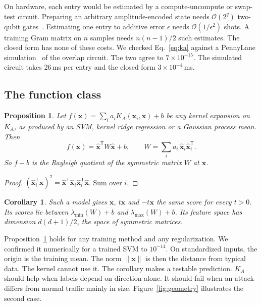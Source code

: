 \documentclass[pdflatex,sn-mathphys-num,lineno]{sn-jnl}
\theoremstyle{thmstyleone}
\newtheorem{proposition}{Proposition}
\newtheorem{corollary}{Corollary}
\begin{document}
On hardware, each entry would be estimated by a compute-uncompute or swap-test
circuit. Preparing an arbitrary amplitude-encoded state needs $\mathcal{O}(2^q)$
two-qubit gates~\cite{mottonen2005transformation}. Estimating one entry to
additive error $\epsilon$ needs $\mathcal{O}(1/\epsilon^2)$ shots. A training Gram
matrix on $n$ samples needs $n(n-1)/2$ such estimates. The closed form has none of
these costs. We checked Eq.~\eqref{eq:ka} against a PennyLane
simulation~\cite{bergholm2018pennylane} of the overlap circuit. The two agree to
$7\times10^{-15}$. The simulated circuit takes 26\,ms per entry and the closed form
$3\times10^{-4}$\,ms.

\subsection{The function class}

\begin{proposition}\label{prop:rayleigh}
Let $f(\mathbf{x})=\sum_i a_i K_A(\mathbf{x}_i,\mathbf{x})+b$ be any kernel expansion
on $K_A$, as produced by an SVM, kernel ridge regression or a Gaussian process
mean. Then
\begin{equation}
f(\mathbf{x}) = \hat{\mathbf{x}}^{\mathsf{T}} W \hat{\mathbf{x}} + b,
\qquad W=\sum_i a_i\,\hat{\mathbf{x}}_i\hat{\mathbf{x}}_i^{\mathsf{T}} .
\label{eq:rayleigh}
\end{equation}
So $f-b$ is the Rayleigh quotient of the symmetric matrix $W$ at $\mathbf{x}$.
\end{proposition}
\begin{proof}
$(\hat{\mathbf{x}}_i^{\mathsf{T}}\hat{\mathbf{x}})^2
=\hat{\mathbf{x}}^{\mathsf{T}}\hat{\mathbf{x}}_i\hat{\mathbf{x}}_i^{\mathsf{T}}\hat{\mathbf{x}}$.
Sum over $i$.
\end{proof}

\begin{corollary}\label{cor:inv}
Such a model gives $\mathbf{x}$, $t\mathbf{x}$ and $-t\mathbf{x}$ the same score for
every $t>0$. Its scores lie between $\lambda_{\min}(W)+b$ and
$\lambda_{\max}(W)+b$. Its feature space has dimension $d(d+1)/2$, the space of
symmetric matrices.
\end{corollary}

Proposition~\ref{prop:rayleigh} holds for any training method and any
regularization. We confirmed it numerically for a trained SVM to $10^{-14}$. On
standardized inputs, the origin is the training mean. The norm $\|\mathbf{x}\|$ is
then the distance from typical data. The kernel cannot use it. The corollary makes
a testable prediction. $K_A$ should help when labels depend on direction alone. It
should fail when an attack differs from normal traffic mainly in size.
Figure~\ref{fig:geometry} illustrates the second case.
\end{document}
